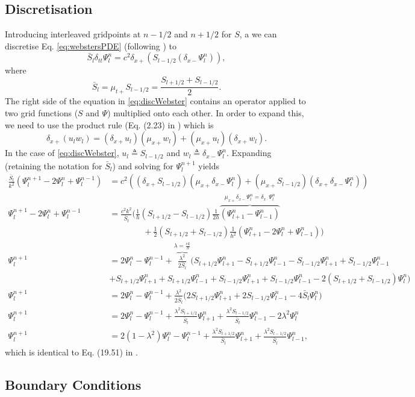 \documentclass{article}
\def\dxp{\delta_{x+}}
\def\dxm{\delta_{x-}}
\def\mup{\mu_{x+}}
\def\Sp{S_{l+1/2}}
\def\Sm{S_{l-1/2}}
\def\Psilp{\Psi_{l+1}^n}
\def\Psilm{\Psi_{l-1}^n}
\def\Psinp{\Psi_l^{n+1}}
\def\Psinm{\Psi_l^{n-1}}
\def\Psiln{\Psi_l^n}
\def\Sbar{\bar S_l}
\begin{document}
\subsection{Discretisation}
Introducing interleaved gridpoints at $n-1/2$ and $n+1/2$ for $S$, a we can discretise Eq. \eqref{eq:webstersPDE} (following \cite{Bilbao2018}) to
\begin{equation}\label{eq:discWebster}
    \Sbar \delta_{tt}\Psi^n_l = c^2\dxp(\Sm(\delta_{x-}\Psiln)),
\end{equation}
where
\begin{equation}
    \Sbar = \mu_{t+}\Sm = \frac{\Sp + \Sm}{2}.
\end{equation}
The right side of the equation in \eqref{eq:discWebster} contains an operator applied to two grid functions ($S$ and $\Psi$) multiplied onto each other. In order to expand this, we need to use the product rule (Eq. (2.23) in \cite{Bilbao2009}) which is
\begin{equation}
    \dxp (u_lw_l) = (\dxp u_l)(\mup{w_l}) + (\mup u_l)(\dxp w_l).
\end{equation}
In the case of \eqref{eq:discWebster}, $u_l \triangleq \Sm$ and $w_l \triangleq \dxm\Psiln$. Expanding (retaining the notation for $\Sbar$) and solving for $\Psinp$ yields
\begin{equation}
    \begin{aligned}
        \frac{\Sbar}{k^2}(\Psinp - 2\Psiln+\Psinm) &= c^2\left((\dxp \Sm)(\mup \dxm \Psiln) + (\mup \Sm)(\dxp \dxm \Psiln)\right)\\
        \Psinp - 2\Psiln+\Psinm &= \frac{c^2k^2}{\Sbar}\bigg(\frac{1}{h}(\Sp - \Sm)\frac{1}{2h}\overbrace{(\Psilp -\Psilm)}^{\mup\dxm\Psiln = \delta_{x\cdot}\Psiln}\\
        &\qquad\qquad+\frac{1}{2}(\Sp + \Sm)\frac{1}{h^2}(\Psilp-2\Psiln+\Psilm)\bigg)\\
        \Psinp &= 2\Psiln-\Psinm + \overbrace{\frac{\lambda^2}{2\Sbar}}^{\lambda = \frac{ck}{h}}\Big(\Sp\Psilp - \Sp\Psilm - \Sm\Psilp + \Sm\Psilm \\
        &+ \Sp\Psilp + \Sp\Psilm + \Sm\Psilp + \Sm\Psilm - 2 (\Sp + \Sm)\Psiln\Big)\\
        \Psinp &= 2\Psiln-\Psinm+ \frac{\lambda^2}{2\Sbar}\Big(2\Sp\Psilp + 2\Sm\Psilm - 4\Sbar\Psiln\Big)\\
        \Psinp &= 2\Psiln-\Psinm+ \frac{\lambda^2\Sp}{\Sbar}\Psilp + \frac{\lambda^2\Sm}{\Sbar}\Psilm - 2\lambda^2\Psiln\\
        \Psinp &= 2(1-\lambda^2)\Psiln-\Psinm+ \frac{\lambda^2\Sp}{\Sbar}\Psilp + \frac{\lambda^2\Sm}{\Sbar}\Psilm,
    \end{aligned}
\end{equation}
which is identical to Eq. (19.51) in \cite{Bilbao2018}.

\subsection{Boundary Conditions}



\end{document}
